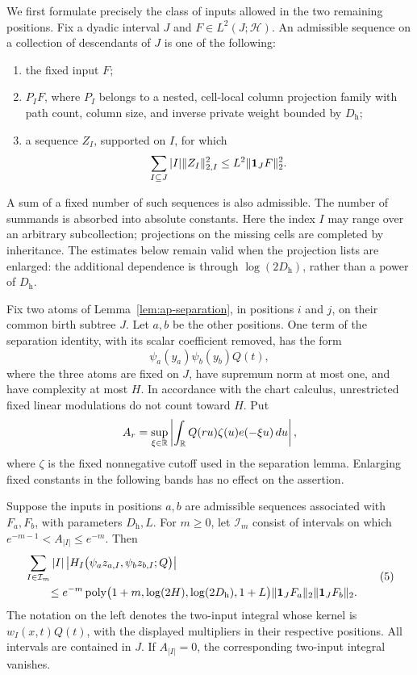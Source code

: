 We first formulate precisely the class of inputs allowed in the two
remaining positions.  Fix a dyadic interval $J$ and $F\in L^2(J;\mathcal H)$.
An admissible sequence on a collection of descendants of $J$ is one of the
following:
\begin{enumerate}
\item the fixed input $F$;
\item $P_I F$, where $P_I$ belongs to a nested, cell-local column projection
family with path count, column size, and inverse private weight bounded by
$D_{\mathrm h}$;
\item a sequence $Z_I$, supported on $I$, for which
\[
 \sum_{I\subseteq J}|I|\|Z_I\|_{2,I}^2
 \le L^2\|\mathbf 1_JF\|_2^2.
\]
\end{enumerate}
A sum of a fixed number of such sequences is also admissible.  The number
of summands is absorbed into absolute constants.  Here the index $I$ may
range over an arbitrary subcollection; projections on the missing cells
are completed by inheritance.  The estimates below remain valid when
the projection lists are enlarged: the additional dependence is through
$\log(2D_{\mathrm h})$, rather than a power of $D_{\mathrm h}$.

Fix two atoms of Lemma~\ref{lem:ap-separation}, in positions $i$ and $j$,
on their common birth subtree $J$.  Let $a,b$ be the other positions.
One term of the separation identity, with its scalar coefficient removed,
has the form
\[
 \psi_a(y_a)\psi_b(y_b)Q(t),
\]
where the three atoms are fixed on $J$, have supremum norm at most one,
and have complexity at most $H$.  In accordance with the chart calculus,
unrestricted fixed linear modulations do not count toward $H$.  Put
\[
 A_r=\sup_{\xi\in\mathbb R}
 \left|\int_{\mathbb R}Q(ru)\zeta(u)e(-\xi u)\,du\right|,
\]
where $\zeta$ is the fixed nonnegative cutoff used in the separation
lemma.  Enlarging fixed constants in the following bands has no effect
on the assertion.

\begin{lemma}
\label{lem:low-scale-sum}
Suppose the inputs in positions $a,b$ are admissible sequences associated
with $F_a,F_b$, with parameters $D_{\mathrm h},L$.  For $m\ge0$, let
$\mathcal I_m$ consist of intervals on which
$e^{-m-1}<A_{|I|}\le e^{-m}$.  Then
\begin{equation*}
\begin{split}
 &\sum_{I\in\mathcal I_m}|I|
 \left|H_I\bigl(\psi_a z_{a,I},\psi_b z_{b,I};Q\bigr)\right|\\
 &\qquad\le
 e^{-m}\operatorname{poly}\bigl(1+m,\log(2H),
                 \log(2D_{\mathrm h}),1+L\bigr)
 \|\mathbf 1_JF_a\|_2\|\mathbf 1_JF_b\|_2.
\end{split}
\tag{5}\label{eq:src-5}
\end{equation*}
The notation on the left denotes the two-input integral whose kernel is
$w_I(x,t)Q(t)$, with the displayed multipliers in their respective
positions.  All intervals are contained in $J$.  If $A_{|I|}=0$, the
corresponding two-input integral vanishes.
\end{lemma}

